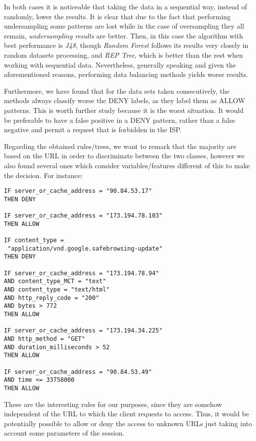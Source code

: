 \documentclass{llncs}
\begin{document}
In both cases it is noticeable that taking the data in a sequential way, instead of randomly, lower the results. It is clear that due to the fact that performing undersampling some patterns are lost while in the case of oversampling they all remain, \textit{undersampling results} are better. Then, in this case the algorithm with best performance is \textit{J48}, though \textit{Random Forest} follows its results very closely in random datasets processing, and \textit{REP Tree}, which is better than the rest when working with sequential data. Nevertheless, generally speaking and given the aforementioned reasons, performing data balancing methods yields worse results.

Furthermore, we have found that for the data sets taken consecutively, the methods always classify worse the DENY labels, as they label them as ALLOW patterns. This is worth further study because it is the worst situation. It would be preferable to have a false positive in a DENY pattern, rather than a false negative and permit a request that is forbidden in the ISP.

Regarding the obtained rules/trees, we want to remark that the majority are based on the URL in order to discriminate between the two classes, however we also found several ones which consider variables/features different of this to make the decision. For instance:\\

\begin{verbatim}
IF server_or_cache_address = "90.84.53.17" 
THEN DENY

IF server_or_cache_address = "173.194.78.103" 
THEN ALLOW

IF content_type = 
 "application/vnd.google.safebrowsing-update" 
THEN DENY

IF server_or_cache_address = "173.194.78.94" 
AND content_type_MCT = "text"
AND content_type = "text/html"
AND http_reply_code = "200"
AND bytes > 772
THEN ALLOW

IF server_or_cache_address = "173.194.34.225"
AND http_method = "GET"
AND duration_milliseconds > 52
THEN ALLOW

IF server_or_cache_address = "90.84.53.49"
AND time <= 33758000
THEN ALLOW
\end{verbatim}

These are the interesting rules for our purposes, since they are somehow independent of the URL to which the client requests to access. Thus, it would be potentially possible to allow or deny the access to unknown URLs just taking into account some parameters of the session.
\end{document}
